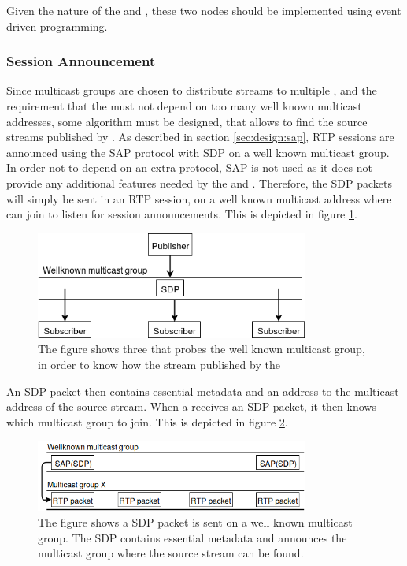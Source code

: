 Given the nature of the \pubs{} and \subs{}, these two nodes should be implemented using event driven programming.


\subsubsection{Session Announcement} \label{sec:design:sessionannouncement}
Since multicast groups are chosen to distribute streams to multiple \subs, and the requirement that the \sub{} must not depend on too many well known multicast addresses, some algorithm must be designed, that allows \subs{} to find the source streams published by \pubs. As described in section \ref{sec:design:sap}, RTP sessions are announced using the SAP protocol with SDP on a well known multicast group. In order not to depend on an extra protocol, SAP is not used as it does not provide any additional features needed by the \pubs{} and \subs{}. Therefore, the SDP packets will simply be sent in an RTP session, on a well known multicast address where \subs{} can join to listen for session announcements. This is depicted in figure \ref{fig:design:pubsub:session_probe}.

\begin{figure}[H]
	\centering
	\includegraphics[width=0.8\textwidth]{figures/session-announcement-probe}
	\caption{The figure shows three \subs{} that probes the well known multicast group, in order to know how the stream published by the \pub{}} \label{fig:design:pubsub:session_probe}
\end{figure}

An SDP packet then contains essential metadata and an address to the multicast address of the source stream. When a \subs{} receives an SDP packet, it then knows which multicast group to join. This is depicted in figure \ref{fig:design:sessionannouncement}.

\begin{figure}[H]
	\centering
	\includegraphics[width=0.8\textwidth]{figures/sap-figure}
	 \caption{The figure shows a SDP packet is sent on a well known multicast group. The SDP contains essential metadata and announces the multicast group where the source stream can be found.}\label{fig:design:sessionannouncement}
\end{figure}



